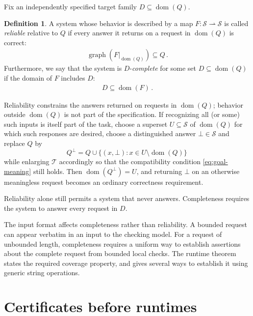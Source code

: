 \documentclass[11pt,twoside]{article}
\theoremstyle{definition}
\newtheorem{definition}[theorem]{Definition}
\newcommand{\Stext}{\mathcal S}
\newcommand{\True}{\mathcal T}
\newcommand{\dom}{\operatorname{dom}}
\begin{document}
Fix an independently specified target family $D\subseteq\dom(Q)$.
\begin{definition}
A system whose behavior is described by a map
$F:\Stext\rightharpoonup\Stext$ is called \emph{reliable}
relative to $Q$ if every answer it returns on a request in $\dom(Q)$ is correct:
\begin{align}
 \operatorname{graph}\!\left(F|_{\dom(Q)}\right)\subseteq Q\,.
 \label{eq:reliability}
\end{align}
Furthermore, we say that the system is $D$-\emph{complete}
for some set $D\subseteq \dom(Q)$
if the domain of $F$ includes $D$:
\begin{align}
 D\subseteq\dom(F)\,.
 \label{eq:complete}
\end{align}
\end{definition}
Reliability constrains the answers returned on requests in $\dom(Q)$; behavior
outside $\dom(Q)$ is not part of the specification.
If recognizing all (or some) such inputs
is itself part of the task,
choose a superset $U\subseteq \Stext$ of $\dom(Q)$ for which such responses are
desired,  choose a distinguished answer $\bot\in\Stext$ and
replace $Q$ by
\begin{equation}
 Q^\bot=Q\cup\{(x,\bot):x\in U \setminus \dom(Q)\}\,
\label{eq:q-totalization}
\end{equation}
while enlarging $\True$
accordingly so that the compatibility condition
\cref{eq:goal-meaning} still holds. Then $\dom(Q^\bot)=U$,
and returning $\bot$ on an
otherwise meaningless request becomes an ordinary correctness requirement.

Reliability alone still permits a system that never answers. Completeness
requires the system to answer every request in $D$.

The input format affects completeness rather than reliability. A bounded
request can appear verbatim in an input to the checking model. For a request of
unbounded length, completeness requires a uniform way to establish assertions
about the complete request from bounded local checks. The runtime theorem
states the required coverage property, and
 gives several ways to establish it using
generic string operations.

\section{Certificates before runtimes}
\label{sec:textual-rules}
\end{document}
